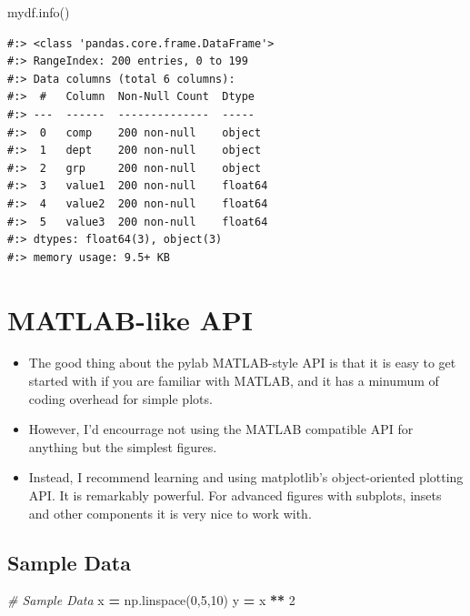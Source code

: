 \documentclass[
]{book}
\newenvironment{Shaded}{\begin{snugshade}}{\end{snugshade}}
\newcommand{\CommentTok}[1]{\textcolor[rgb]{0.37,0.37,0.37}{\textit{#1}}}
\newcommand{\DecValTok}[1]{\textcolor[rgb]{0.06,0.06,0.06}{#1}}
\newcommand{\NormalTok}[1]{#1}
\newcommand{\OperatorTok}[1]{\textcolor[rgb]{0.43,0.43,0.43}{\textbf{#1}}}
\providecommand{\tightlist}{%
  \setlength{\itemsep}{0pt}\setlength{\parskip}{0pt}}
\begin{document}
\begin{Shaded}
\begin{Highlighting}[]
\NormalTok{mydf.info()}
\end{Highlighting}
\end{Shaded}

\begin{verbatim}
#:> <class 'pandas.core.frame.DataFrame'>
#:> RangeIndex: 200 entries, 0 to 199
#:> Data columns (total 6 columns):
#:>  #   Column  Non-Null Count  Dtype  
#:> ---  ------  --------------  -----  
#:>  0   comp    200 non-null    object 
#:>  1   dept    200 non-null    object 
#:>  2   grp     200 non-null    object 
#:>  3   value1  200 non-null    float64
#:>  4   value2  200 non-null    float64
#:>  5   value3  200 non-null    float64
#:> dtypes: float64(3), object(3)
#:> memory usage: 9.5+ KB
\end{verbatim}

\hypertarget{matlab-like-api}{%
\section{MATLAB-like API}\label{matlab-like-api}}

\begin{itemize}
\tightlist
\item
  The good thing about the pylab MATLAB-style API is that it is easy to get started with if you are familiar with MATLAB, and it has a minumum of coding overhead for simple plots.\\
\item
  However, I'd encourrage not using the MATLAB compatible API for anything but the simplest figures.\\
\item
  Instead, I recommend learning and using matplotlib's object-oriented plotting API. It is remarkably powerful. For advanced figures with subplots, insets and other components it is very nice to work with.
\end{itemize}

\hypertarget{sample-data-17}{%
\subsection{Sample Data}\label{sample-data-17}}

\begin{Shaded}
\begin{Highlighting}[]
\CommentTok{# Sample Data}
\NormalTok{x }\OperatorTok{=}\NormalTok{ np.linspace(}\DecValTok{0}\NormalTok{,}\DecValTok{5}\NormalTok{,}\DecValTok{10}\NormalTok{)}
\NormalTok{y }\OperatorTok{=}\NormalTok{ x }\OperatorTok{**} \DecValTok{2}
\end{Highlighting}
\end{Shaded}
\end{document}
